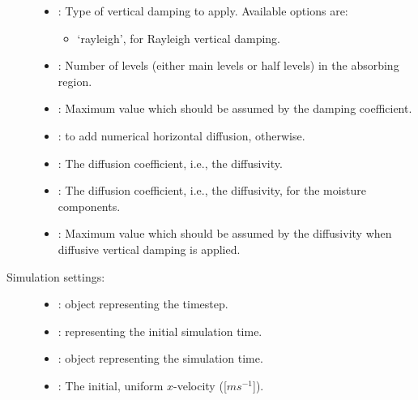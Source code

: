 \documentclass[letterpaper,10pt,english]{sphinxmanual}
\begin{document}
\begin{description}
\begin{itemize}
\item {} 
: Type of vertical damping to apply. Available options are:
\begin{itemize}
\item {} 
‘rayleigh’, for Rayleigh vertical damping.

\end{itemize}

\item {} 
: Number of levels (either main levels or half levels) in the absorbing region.

\item {} 
: Maximum value which should be assumed by the damping coefficient.

\item {} 
:  to add numerical horizontal diffusion,  otherwise.

\item {} 
: The diffusion coefficient, i.e., the diffusivity.

\item {} 
: The diffusion coefficient, i.e., the diffusivity, for the moisture components.

\item {} 
: Maximum value which should be assumed by the diffusivity when diffusive vertical damping is applied.

\end{itemize}

\item[{Simulation settings:}] \leavevmode\begin{itemize}
\item {} 
:  object representing the timestep.

\item {} 
:  representing the initial simulation time.

\item {} 
:  object representing the simulation time.

\item {} 
: The initial, uniform \(x\)-velocity ({[}\(m s^{-1}\){]}).


\end{itemize}
\end{description}
\end{document}

